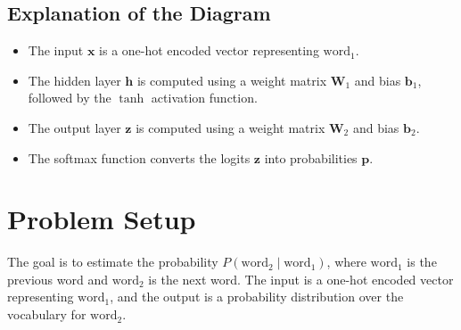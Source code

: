\begin{notechapter}
\begin{center}
\end{center}

\subsection{Explanation of the Diagram}
\begin{itemize}
    \item The input \(\mathbf{x}\) is a one-hot encoded vector representing
          \(\text{word}_1\).
    \item The hidden layer \(\mathbf{h}\) is computed using a weight matrix
          \(\mathbf{W}_1\) and bias \(\mathbf{b}_1\), followed by the \(\tanh\)
          activation function.
    \item The output layer \(\mathbf{z}\) is computed using a weight matrix
          \(\mathbf{W}_2\) and bias \(\mathbf{b}_2\).
    \item The softmax function converts the logits \(\mathbf{z}\) into
          probabilities \(\mathbf{p}\).
\end{itemize}

\section{Problem Setup}
The goal is to estimate the probability \( P(\text{word}_2 \mid \text{word}_1) \),
where \(\text{word}_1\) is the previous word and \(\text{word}_2\) is the next
word. The input is a one-hot encoded vector representing \(\text{word}_1\), and
the output is a probability distribution over the vocabulary for \(\text{word}_2\).


\end{notechapter}
